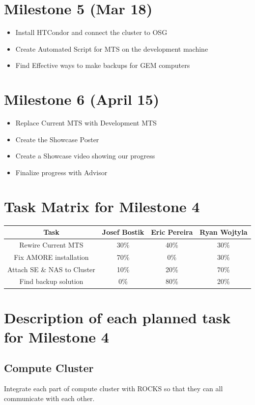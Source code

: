 \documentclass[12pt]{article}
\newcommand\tab[1][1cm]{\hspace*{#1}}
\begin{document}
\section{Milestone 5 (Mar 18)}
\begin{itemize}
	\item Install HTCondor and connect the cluster to OSG
	\item Create Automated Script for MTS on the development machine
	\item Find Effective ways to make backups for GEM computers
\end{itemize}

\section{Milestone 6 (April 15)}
\begin{itemize}
	\item Replace Current MTS with Development MTS
	\item Create the Showcase Poster
	\item Create a Showcase video showing our progress
	\item Finalize progress with Advisor
\end{itemize}

\section{Task Matrix for Milestone 4}
\begin{tabular}{| c | c | c | c |}
	\hline 
	Task & Josef Bostik & Eric Pereira & Ryan Wojtyla \\
	\hline 
	Rewire Current MTS & 30\% & 40\% & 30\% \\
	\hline 
	Fix AMORE installation & 70\% & 0\% & 30\% \\
	\hline
	Attach SE \& NAS to Cluster & 10\% & 20\% & 70\% \\
	\hline
	Find backup solution & 0\% & 80\% & 20\% \\
	\hline
	
\end{tabular}


\section{Description of each planned task for Milestone 4}
\subsection{Compute Cluster}
\tab Integrate each part of compute cluster with ROCKS so that they can all communicate with each other.
\end{document}
